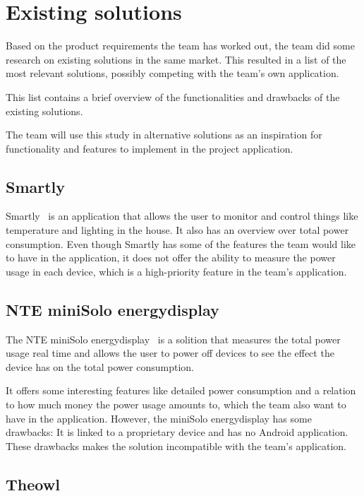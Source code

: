 \section{Existing solutions}
\label{sec:altsolution}
Based on the product requirements the team has worked out, the team did some research on existing solutions in the same market. This resulted in a list of the most relevant solutions, possibly competing with the team's own application.
 
This list contains a brief overview of the functionalities and drawbacks of the existing solutions. 

The team will use this study in alternative solutions as an inspiration for functionality and features to implement in the project application.

\subsection{Smartly}

Smartly~\cite{smartly} is an application that allows the user to monitor and control things like temperature and lighting in the house. It also has an overview over total power consumption. Even though Smartly has some of the features the team would like to have in the application, it does not offer the ability to measure the power usage in each device, which is a high-priority feature in the team's application.


\subsection{NTE miniSolo energydisplay}

The NTE miniSolo energydisplay~\cite{nte} is a solition that measures the total power usage real time and allows the user to power off devices to see the effect the device has on the total power consumption. 

It offers some interesting features like detailed power consumption and a relation to how much money the power usage amounts to, which the team also want to have in the application. However, the miniSolo energydisplay has some drawbacks: It is linked to a proprietary device and has no Android application. These drawbacks makes the solution incompatible with the team's application.



\subsection{Theowl}

